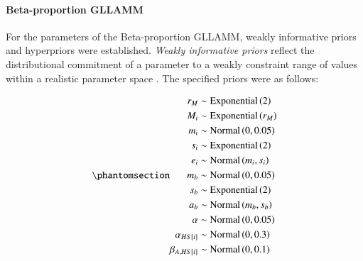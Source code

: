 \documentclass[
  authoryear,
  preprint,
  1p]{elsarticle}
\let\oldparagraph\paragraph
\renewcommand{\paragraph}[1]{\oldparagraph{#1}\mbox{}}
\begin{document}
\paragraph{Beta-proportion GLLAMM}\label{sec-M-SM-P-BGLLAMM}

For the parameters of the Beta-proportion GLLAMM, weakly informative
priors and hyperpriors were established. \emph{Weakly informative
priors} reflect the distributional commitment of a parameter to a weakly
constraint range of values within a realistic parameter space
\citep{McElreath_2020}. The specified priors were as follows:

\begin{equation}\phantomsection\label{eq-beta-GLLAMM-priors}{
\begin{aligned}
r_{M} &\sim \text{Exponential}\left( 2 \right) \\ 
M_{i} &\sim \text{Exponential}\left( r_{M} \right) \\
m_{i} &\sim \text{Normal} \left( 0, 0.05 \right) \\
s_{i} &\sim \text{Exponential} \left( 2 \right) \\
e_{i} &\sim \text{Normal} \left( m_{i}, s_{i} \right) \\
m_{b} &\sim \text{Normal} \left( 0, 0.05 \right) \\
s_{b} &\sim \text{Exponential} \left( 2 \right) \\
a_{b} &\sim \text{Normal} \left( m_{b}, s_{b} \right) \\
\alpha &\sim \text{Normal} \left( 0, 0.05 \right) \\
\alpha_{HS[i]} &\sim \text{Normal} \left( 0, 0.3 \right) \\
\beta_{A,HS[i]} &\sim \text{Normal} \left( 0, 0.1 \right)
\end{aligned} 
}\end{equation}
\end{document}
